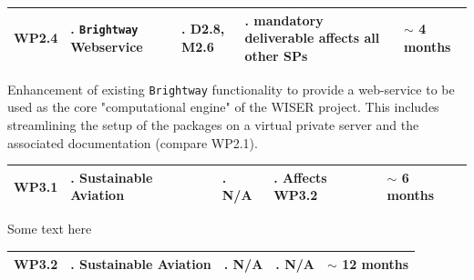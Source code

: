 \documentclass{article}
\begin{document}
    \begin{table}[H]
        \centering
        \begin{tabularx}{\linewidth}{
            |>{\hsize=0.25\hsize}X
            |>{\hsize=1.\hsize}X
            |>{\hsize=1.\hsize}X
            |>{\hsize=1.\hsize}X
            |>{\hsize=0.75\hsize}X|
          } %
            \hline
                WP2.4
            &
                \texttt{Brightway} Webservice
            &
                D2.8, M2.6
            &
                mandatory deliverable \newline affects all other SPs 
            &
                $\sim$ 4 months
            \\
            \hline
        \end{tabularx}
    \end{table}
    
    Enhancement of existing \texttt{Brightway} functionality to provide a web-service to be used as the core "computational engine" of the WISER project. This includes streamlining the setup of the packages on a virtual private server and the associated documentation (compare WP2.1). 

    \begin{table}[H]
        \centering
        \begin{tabularx}{\linewidth}{
            |>{\hsize=0.25\hsize}X
            |>{\hsize=1.\hsize}X
            |>{\hsize=1.\hsize}X
            |>{\hsize=1.\hsize}X
            |>{\hsize=0.75\hsize}X|
          } %
            \hline
                WP3.1
            &
                Sustainable Aviation
            &
                N/A
            &
                Affects WP3.2
            &
                $\sim$ 6 months
            \\
            \hline
        \end{tabularx}
    \end{table}
    
    Some text here
    
    \begin{table}[H]
        \centering
        \begin{tabularx}{\linewidth}{
            |>{\hsize=0.25\hsize}X
            |>{\hsize=1.\hsize}X
            |>{\hsize=1.\hsize}X
            |>{\hsize=1.\hsize}X
            |>{\hsize=0.75\hsize}X|
          } %
            \hline
                WP3.2
            &
                Sustainable Aviation
            &
                N/A
            &
                N/A
            &
                $\sim$ 12 months
            \\
            \hline
        \end{tabularx}
    \end{table}
    
\end{document}
